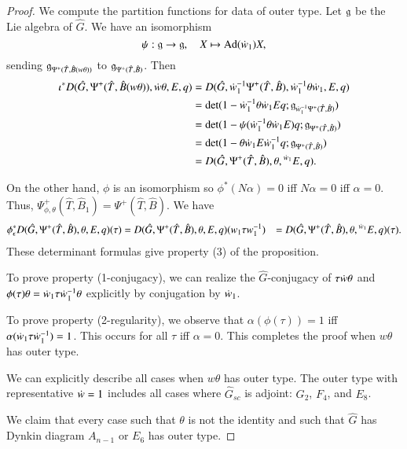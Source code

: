 \begin{proof}
We compute the partition functions for data of outer type.
Let ${\mathfrak g}$ be the Lie algebra of $\hat G$.  We have an isomorphism
\[
\psi:{\mathfrak g}\to {\mathfrak g},\quad X\mapsto {\operatorname{Ad}}(\dot w_1) X,
\]
sending ${\mathfrak g}_{\Psi^+(\hat T,\hat B(w\theta))}$ to ${\mathfrak g}_{\Psi^+(\hat T,\hat B)}$.  Then
\begin{align*}
\iota^* D(\hat G,\Psi^+(\hat T,\hat B(w\theta)),\dot w\theta,E,q) &=
D(\hat G,\dot w_1^{-1}\Psi^+(\hat T,\hat B),\dot w_1^{-1}\theta \dot w_1,E,q) \\ &=
\det(1-\dot w_1^{-1} \theta\dot w_1 E q; {\mathfrak g}_{\dot w_1^{-1}\Psi^+(\hat T,\hat B)}) \\ &=
\det(1 - \psi(\dot w_1^{-1} \theta\dot w_1 E) q; {\mathfrak g}_{\Psi^+(\hat T,\hat B)}) \\ &=
\det(1- \theta \dot w_1 E \dot w_1^{-1} q;{\mathfrak g}_{\Psi^+(\hat T,\hat B)}) \\ &=
D(\hat G,\Psi^+(\hat T,\hat B),\theta,{}^{\dot w_1} E,q).
\end{align*}

On the other hand, $\phi$ is an isomorphism so $\phi^*(N\alpha)=0$ iff
$N\alpha=0$ iff $\alpha=0$.  Thus, $\Psi_{\phi,\theta}^+(\hat T,\hat B_1) = 
\Psi^+(\hat T,\hat B)$.  We have
\begin{align*}
\phi^*_\epsilon D(\hat G,\Psi^+(\hat T,\hat B),\theta,E,q)(\tau) &=
D(\hat G,\Psi^+(\hat T,\hat B),\theta,E,q) (w_1\tau w_1^{-1}) &=
D(\hat G,\Psi^+(\hat T,\hat B),\theta,{}^{\dot w_1} E,q) (\tau).
\end{align*}
These determinant formulas give property (3) of the proposition.

To prove property (1-conjugacy), we can realize the $\hat G$-conjugacy
of $\tau \dot w \theta$ and $\phi(\tau)\theta = \dot w_1\tau
\dot w_1^{-1}\theta$ explicitly by conjugation by $\dot w_1$.

To prove property (2-regularity), we observe that
$\alpha(\phi(\tau))=1$ iff $\alpha(\dot w_1\tau\dot w_1^{-1})=1$.  This
occurs for all $\tau$ iff $\alpha=0$.
This completes the proof when $w\theta$ has outer type.


We can explicitly describe all cases when $w\theta$ has outer type.
The outer type with representative $\dot w = 1$ includes all cases
where $\hat G_{sc}$ is adjoint: $G_2$, $F_4$, and $E_8$.

We claim that every case such that $\theta$ is not the identity and
such that $\hat G$ has Dynkin diagram $A_{n-1}$ or $E_6$ has outer type.


\end{proof}
